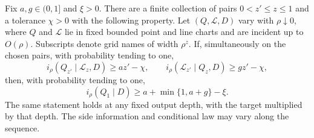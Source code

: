 \begin{lemma}
\label{low:conditional-incidence}
Fix $a,g\in(0,1]$ and $\xi>0$. There are a finite collection of pairs
$0<z'\leq z\leq1$ and a tolerance $\chi>0$ with the following property.
Let $(Q,\mathcal L,D)$ vary with $\rho\downarrow0$, where $Q$ and
$\mathcal L$ lie in fixed bounded point and line charts and are incident
up to $O(\rho)$. Subscripts denote grid names of width $\rho^z$.
If, simultaneously on the chosen pairs, with probability tending to one,
\begin{equation}
 i_\rho(Q_{z'}\mid\mathcal L_z,D)\geq az'-\chi,
 \qquad
 i_\rho(\mathcal L_{z'}\mid Q_z,D)\geq gz'-\chi,
 \tag{cond}\label{eq:cond}
\end{equation}
then, with probability tending to one,
\begin{equation}
 i_\rho(Q_1\mid D)\geq a+\min\{1,a+g\}-\xi.
 \tag{inc}\label{eq:inc}
\end{equation}
The same statement holds at any fixed output depth, with the target
multiplied by that depth. The side information and conditional law may
vary along the sequence.
\end{lemma}

